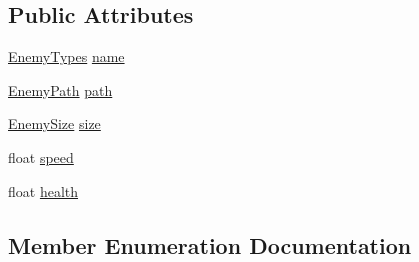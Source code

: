 \subsection*{Public Attributes}
\begin{DoxyCompactItemize}
\item 
\hyperlink{class_wave_d_b_1_1_enemy_data_af2724714b62807d0eadf70f69019be9c}{Enemy\+Types} \hyperlink{class_wave_d_b_1_1_enemy_data_ade640213f83337f5297088b632ce5602}{name}
\item 
\hyperlink{class_wave_d_b_1_1_enemy_data_acbefce08e6d5ef766be909fb89eda0ad}{Enemy\+Path} \hyperlink{class_wave_d_b_1_1_enemy_data_ac089ceb4675562767f944854075b1652}{path}
\item 
\hyperlink{class_wave_d_b_1_1_enemy_data_a2c2210697722767dae7b117370470742}{Enemy\+Size} \hyperlink{class_wave_d_b_1_1_enemy_data_a14aac280b485d94e1c2a276059793351}{size}
\item 
float \hyperlink{class_wave_d_b_1_1_enemy_data_ae3809cd08031f91212306be073ab6bcf}{speed}
\item 
float \hyperlink{class_wave_d_b_1_1_enemy_data_a8619c09080488cf5245f54d80630023f}{health}
\end{DoxyCompactItemize}


\subsection{Member Enumeration Documentation}
